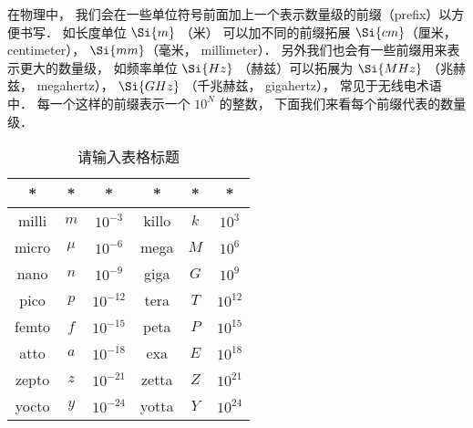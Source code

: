 
在物理中， 我们会在一些单位符号前面加上一个表示数量级的前缀（prefix）以方便书写． 如长度单位 $\Si{m}$ （米） 可以加不同的前缀拓展 $\Si{cm}$（厘米， centimeter）， $\Si{mm}$（毫米， millimeter）． 另外我们也会有一些前缀用来表示更大的数量级， 如频率单位 $\Si{Hz}$ （赫兹）可以拓展为 $\Si{MHz}$ （兆赫兹， megahertz）， $\Si{GHz}$ （千兆赫兹， gigahertz）， 常见于无线电术语中． 每一个这样的前缀表示一个 $10^N$ 的整数， 下面我们来看每个前缀代表的数量级．

\begin{table}[ht]
\centering
\caption{请输入表格标题}\label{UniPre_tab1}
\begin{tabular}{|c|c|c|c|c|c|}
\hline
* & * & * & * & * & * \\
\hline
milli & $m$ & $10^{-3}$ & killo & $k$ & $10^3$ \\
\hline
micro & $\mu$ & $10^{-6}$ & mega & $M$ & $10^6$ \\
\hline
nano & $n$ & $10^{-9}$ & giga & $G$ & $10^9$ \\
\hline
pico & $p$ & $10^{-12}$ & tera & $T$ & $10^{12}$ \\
\hline
femto & $f$ & $10^{-15}$ & peta & $P$ & $10^{15}$ \\
\hline
atto & $a$ & $10^{-18}$ & exa & $E$ & $10^{18}$ \\
\hline
zepto & $z$ & $10^{-21}$ & zetta & $Z$ & $10^{21}$ \\
\hline
yocto & $y$ & $10^{-24}$ & yotta & $Y$ & $10^{24}$ \\
\hline
\end{tabular}
\end{table}
